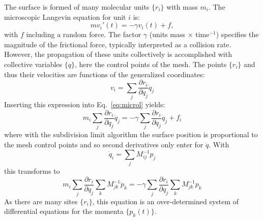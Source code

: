 \documentclass[11pt]{article}
\begin{document}
The surface is formed of many molecular units $\{ r_i \}$ with mass $m_i$.
The microscopic Langevin equation for unit $i$ is:
\begin{equation}
\label{eq:microl}
m v_i'(t) = -\gamma v_i(t) + f, 
\end{equation}
with $f$ including a random force.
The factor $\gamma$ (units mass $\times$ time$^{-1}$) specifies the magnitude of the frictional force, typically interpreted as a collision rate.
However, the propagation of these units collectively is accomplished with collective variables $\{ q \}$, here the control points of the mesh.
The points $\{ r_i \}$ and thus their velocities are functions of the generalized coordinates:
\begin{equation}
v_i = \sum_j \frac{\partial r_i}{\partial q_j} \dot{q}_j
\end{equation}
Inserting this expression into Eq.~\ref{eq:microl} yields:
\begin{equation}
m_i \sum_j \frac{\partial r_i}{\partial q_j} \ddot{q}_j = -\gamma \sum_j \frac{\partial r_i}{\partial q_j} \dot{q}_j + f_i 
\end{equation}
where with the subdivision limit algorithm the surface position is proportional to the mesh control points and so second derivatives only enter for $\ddot{q}$.
With
\begin{equation}
\dot{q}_i = \sum_j M^{-1}_{ij} p_j 
\end{equation}
this transforms to
\begin{equation}
m_i \sum_j \frac{\partial r_i}{\partial q_j} \sum_{k} M^{-1}_{jk} \dot{p}_k = -\gamma \sum_j \frac{\partial r_i}{\partial q_j} \sum_k M^{-1}_{jk} p_k
\end{equation}
As there are many sites $\{ r_i \}$, this equation is an over-determined system of differential equations for the momenta $\{p_k(t)\}$.
\end{document}
